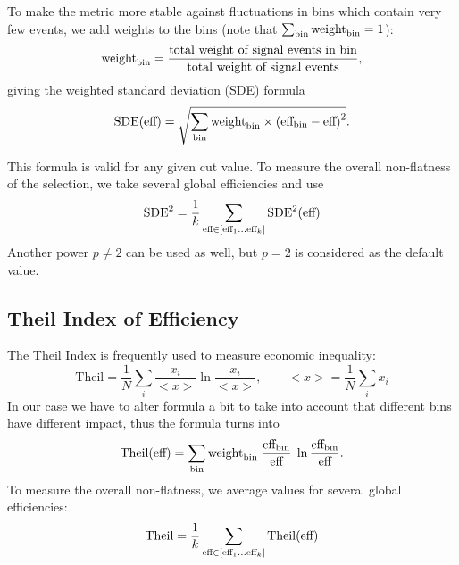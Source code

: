 To make the metric more stable against fluctuations in bins which contain very few events, we add weights to the bins (note that $\sum_{\text{bin}} \text{weight}_\text{bin} = 1$):
\[
	\text{weight}_\text{bin} = \dfrac{\text{total weight of signal events in bin}}
		{\text{total weight of signal events}},
\]
giving the weighted standard deviation (SDE) formula
\[
	\text{SDE}(\text{eff}) = 
	\sqrt{\sum_{\text{bin}} \text{weight}_\text{bin} \times \left(\text{eff}_\text{bin} - \text{eff} \right)^2}. 
\] 


This formula is valid for any given cut value. To measure the overall non-flatness of the selection, we
take several global efficiencies and use
\[
	\text{SDE}^2  =  \frac{1}{k} 
	\sum_{\text{eff} \in [\text{eff}_1 \dots \text{eff}_k] }  
		\text{SDE}^2(\text{eff})
\]
Another power $p \neq 2$ can be used as well, but $p=2$ is considered as the default value.
%
%

\subsection{Theil Index of Efficiency}
\def\theil{\text{Theil}}

The Theil Index is frequently used to measure economic inequality:
\[
	\theil = \frac{1}{N} \sum_i \frac{x_i}{<x>} \ln{\frac{x_i}{<x>}}, 
		\qquad <x> = \frac{1}{N} \sum_i x_i
\]
In our case we have to alter formula a bit to take into account that different bins have different impact, thus the formula turns into
\[
	\theil(\globaleff) = \sum_\bin \binweight \; \frac{\bineff}{\globaleff} \; \ln{\frac{\bineff}{\globaleff}}.
\]
To measure the overall non-flatness, we
average values for several global efficiencies:
\[
	\theil  =  \frac{1}{k} 
	\sum_{\globaleff \in [\globaleff_1 \dots \globaleff_k] }  
		\theil(\globaleff)
\]

